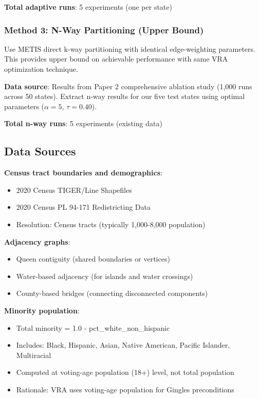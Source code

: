 \textbf{Total adaptive runs}: 5 experiments (one per state)

\subsubsection{Method 3: N-Way Partitioning (Upper Bound)}

Use METIS direct k-way partitioning with identical edge-weighting parameters. This provides upper bound on achievable performance with same VRA optimization technique.

\textbf{Data source}: Results from Paper 2 comprehensive ablation study (1,000 runs across 50 states). Extract n-way results for our five test states using optimal parameters ($\alpha = 5$, $\tau = 0.40$).

\textbf{Total n-way runs}: 5 experiments (existing data)

\subsection{Data Sources}

\textbf{Census tract boundaries and demographics}:
\begin{itemize}
\item 2020 Census TIGER/Line Shapefiles
\item 2020 Census PL 94-171 Redistricting Data
\item Resolution: Census tracts (typically 1,000-8,000 population)
\end{itemize}

\textbf{Adjacency graphs}:
\begin{itemize}
\item Queen contiguity (shared boundaries or vertices)
\item Water-based adjacency (for islands and water crossings)
\item County-based bridges (connecting disconnected components)
\end{itemize}

\textbf{Minority population}:
\begin{itemize}
\item Total minority = 1.0 - pct\_white\_non\_hispanic
\item Includes: Black, Hispanic, Asian, Native American, Pacific Islander, Multiracial
\item Computed at voting-age population (18+) level, not total population
\item Rationale: VRA uses voting-age population for Gingles preconditions
\end{itemize}

